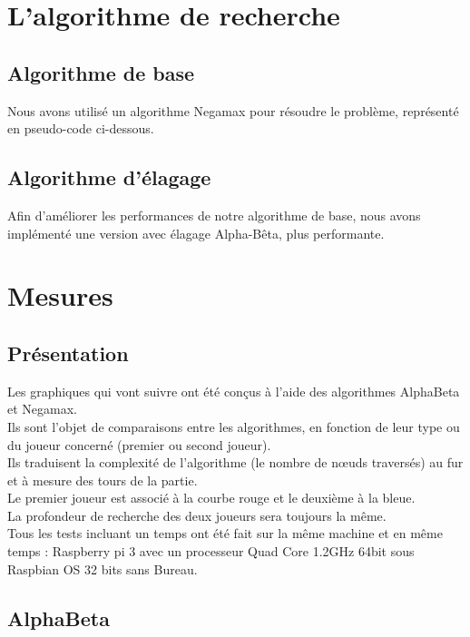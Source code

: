 \documentclass[12pt]{article}
\begin{document}
\section{L'algorithme de recherche}
\subsection{Algorithme de base}

Nous avons utilisé un algorithme Negamax pour résoudre le problème, représenté en pseudo-code ci-dessous.



\newpage
\subsection{Algorithme d'élagage}

Afin d'améliorer les performances de notre algorithme de base, nous avons implémenté une version avec élagage Alpha-Bêta, plus performante.



\newpage
\section{Mesures}

\subsection{Présentation}

Les graphiques qui vont suivre ont été conçus à l’aide des algorithmes AlphaBeta et Negamax.\\
Ils sont l’objet de comparaisons entre les algorithmes, en fonction de leur type ou du joueur concerné (premier ou second joueur).\\
Ils traduisent la complexité de l’algorithme (le nombre de nœuds traversés) au fur et à mesure des tours de la partie.\\
Le premier joueur est associé à la courbe rouge et le deuxième à la bleue.\\
La profondeur de recherche des deux joueurs sera toujours la même.\\

Tous les tests incluant un temps ont été fait sur la même machine et en même temps : Raspberry pi 3 avec un processeur Quad Core 1.2GHz 64bit sous Raspbian OS 32 bits sans Bureau.
\newpage
\subsection{AlphaBeta}
\end{document}
